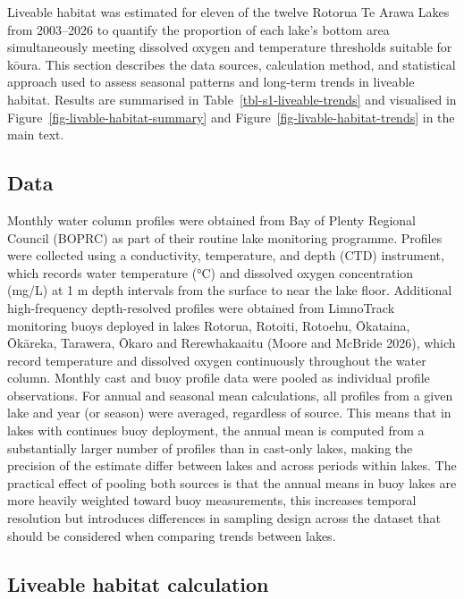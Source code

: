 \documentclass[
  12pt,
  a4paper,
  oneside]{scrbook}
\begin{document}
Liveable habitat was estimated for eleven of the twelve Rotorua Te Arawa
Lakes from 2003--2026 to quantify the proportion of each lake's bottom
area simultaneously meeting dissolved oxygen and temperature thresholds
suitable for kōura. This section describes the data sources, calculation
method, and statistical approach used to assess seasonal patterns and
long-term trends in liveable habitat. Results are summarised in
Table~\ref{tbl-s1-liveable-trends} and visualised in
Figure~\ref{fig-livable-habitat-summary} and
Figure~\ref{fig-livable-habitat-trends} in the main text.

\subsection{Data}\label{data}

Monthly water column profiles were obtained from Bay of Plenty Regional
Council (BOPRC) as part of their routine lake monitoring programme.
Profiles were collected using a conductivity, temperature, and depth
(CTD) instrument, which records water temperature (°C) and dissolved
oxygen concentration (mg/L) at 1 m depth intervals from the surface to
near the lake floor. Additional high-frequency depth-resolved profiles
were obtained from LimnoTrack monitoring buoys deployed in lakes
Rotorua, Rotoiti, Rotoehu, Ōkataina, Ōkāreka, Tarawera, Ōkaro and
Rerewhakaaitu (Moore and McBride 2026), which record temperature and
dissolved oxygen continuously throughout the water column. Monthly cast
and buoy profile data were pooled as individual profile observations.
For annual and seasonal mean calculations, all profiles from a given
lake and year (or season) were averaged, regardless of source. This
means that in lakes with continues buoy deployment, the annual mean is
computed from a substantially larger number of profiles than in
cast-only lakes, making the precision of the estimate differ between
lakes and across periods within lakes. The practical effect of pooling
both sources is that the annual means in buoy lakes are more heavily
weighted toward buoy measurements, this increases temporal resolution
but introduces differences in sampling design across the dataset that
should be considered when comparing trends between lakes.

\subsection{Liveable habitat
calculation}\label{liveable-habitat-calculation}
\end{document}
